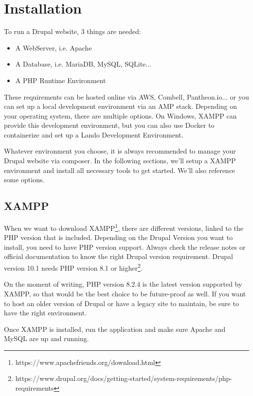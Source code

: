 \chapter{Installation}
\label{ch:Installation}

To run a Drupal website, 3 things are needed:
\begin{itemize}
    \item A WebServer, i.e. Apache
    \item A Database, i.e. MariaDB, MySQL, SQLite...
    \item A PHP Runtime Environment
    
\end{itemize}


These requirements can be hosted online via AWS, Combell, Pantheon.io... or you can set up a local development environment via an AMP stack. Depending on your operating system, there are multiple options. On Windows, XAMPP can provide this development environment, but you can also use Docker to containerize and set up a Lando Development Environment.

Whatever environment you choose, it is always recommended to manage your Drupal website via composer. In the following sections, we'll setup a XAMPP environment and install all necessary tools to get started. We'll also reference some options.

\section{XAMPP}
\label{sc:xampp}
When we want to download XAMPP\footnote{https://www.apachefriends.org/download.html}, there are different versions, linked to the PHP version that is included. Depending on the Drupal Version you want to install, you need to have PHP version support. Always check the release notes or official documentation to know the right Drupal version requirement. Drupal version 10.1 needs PHP version 8.1 or higher\footnote{https://www.drupal.org/docs/getting-started/system-requirements/php-requirements}.

On the moment of writing, PHP version 8.2.4 is the latest version supported by XAMPP, so that would be the best choice to be future-proof as well. If you want to host an older version of Drupal or have a legacy site to maintain, be sure to have the right environment.

Once XAMPP is installed, run the application and make sure Apache and MySQL are up and running.


